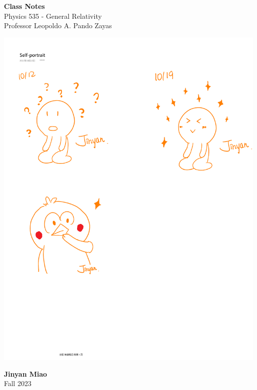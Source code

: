 \documentclass[11pt, onesided]{book}
\theoremstyle{break}
\theoremstyle{break}
\begin{document}
	\begin{titlepage}
		\begin{center}
			\vspace*{0.5cm}
			\Huge \color{red}
				\textbf{Class Notes}\\
			\vspace{0.5cm}			
			\Large \color{black}
			Physics 535 - General Relativity\\
			Professor Leopoldo A. Pando Zayas
			\vspace{1.5cm}

			\includegraphics[scale=1.15]{hmm.pdf}
			
			
			\vspace{2cm}
			\LARGE
				\textbf{Jinyan Miao}\\
				\hfill\break
				\LARGE Fall 2023\\
			\vspace{1cm}

		\vspace*{\fill}
		\end{center}			
	\end{titlepage}
\end{document}
